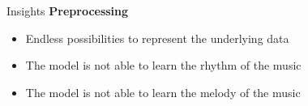 \documentclass[xcolor={dvipsnames},12pt]{beamer}
\begin{document}
\begin{frame}{Insights}
    \textbf{Preprocessing}
    \begin{itemize}
        \item Endless possibilities to represent the underlying data
        \item The model is not able to learn the rhythm of the music
        \item The model is not able to learn the melody of the music
    \end{itemize}
    
\end{frame}
\end{document}
